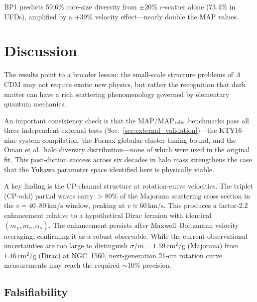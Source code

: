 \documentclass[aps,prd,twocolumn,superscriptaddress,nofootinbib]{revtex4-2}
\newcommand{\sigmam}{\sigma/m}
\newcommand{\kms}{\,\text{km/s}}
\newcommand{\cmg}{\,\text{cm}^2/\text{g}}
\newcommand{\mchi}{m_\chi}
\newcommand{\mphi}{m_\phi}
\begin{document}
BP1 predicts 59.6\% core-size diversity from $\pm 20\%$
$c$-scatter alone (73.4\% in UFDs), amplified by a
+39\% velocity effect---nearly double the MAP values.

\section{Discussion}\label{sec:discussion}

The results point to a broader lesson: the small-scale structure
problems of $\Lambda$CDM may not require exotic new physics, but
rather the recognition that dark matter can have a rich scattering
phenomenology governed by elementary quantum mechanics.

An important consistency check is that the MAP/MAP$_{\rm relic}$
benchmarks pass all three independent external tests
(Sec.~\ref{sec:external_validation})---the KTY16 nine-system
compilation, the Fornax globular-cluster timing bound, and the
Oman et al.\ halo diversity distribution---none of which were
used in the original fit.  This post-diction success across six
decades in halo mass strengthens the case that the Yukawa
parameter space identified here is physically viable.

A key finding is the CP-channel structure at rotation-curve
velocities.  The triplet (CP-odd) partial waves carry $>80\%$ of
the Majorana scattering cross section in the $v=40$--$80\kms$
window, peaking at $v\approx 60\kms$.  This produces a factor-2.2
enhancement relative to a hypothetical Dirac fermion with identical
$(\mchi,\mphi,\alpha_s)$.  The enhancement persists after
Maxwell--Boltzmann velocity averaging, confirming it as a robust
observable.  While the current observational uncertainties are too
large to distinguish $\sigmam=1.59\cmg$ (Majorana) from
$1.46\cmg$ (Dirac) at NGC~1560, next-generation 21-cm rotation
curve measurements may reach the required $\sim 10\%$ precision.

\subsection{Falsifiability}\label{sec:falsifiability}
\end{document}
